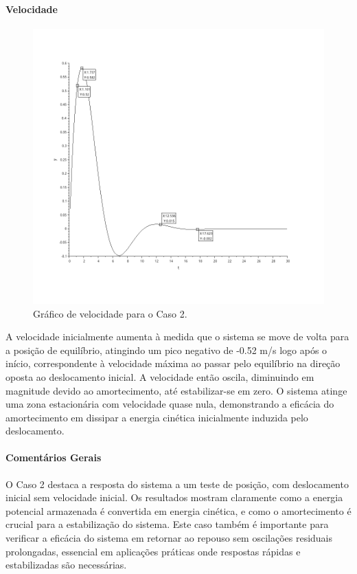 \paragraph{Velocidade}
\begin{figure}[H]
    \centering
    \includegraphics[height=0.7\textwidth]{atividades/2-atividade/assets/velocidade-caso-2.png}
    \caption{Gráfico de velocidade para o Caso 2.}
\end{figure}
A velocidade inicialmente aumenta à medida que o sistema se move de volta para a posição de equilíbrio, atingindo um pico negativo de -0.52 m/s logo após o início, correspondente à velocidade máxima ao passar pelo equilíbrio na direção oposta ao deslocamento inicial. A velocidade então oscila, diminuindo em magnitude devido ao amortecimento, até estabilizar-se em zero. O sistema atinge uma zona estacionária com velocidade quase nula, demonstrando a eficácia do amortecimento em dissipar a energia cinética inicialmente induzida pelo deslocamento.

\paragraph{Comentários Gerais}
O Caso 2 destaca a resposta do sistema a um teste de posição, com deslocamento inicial sem velocidade inicial. Os resultados mostram claramente como a energia potencial armazenada é convertida em energia cinética, e como o amortecimento é crucial para a estabilização do sistema. Este caso também é importante para verificar a eficácia do sistema em retornar ao repouso sem oscilações residuais prolongadas, essencial em aplicações práticas onde respostas rápidas e estabilizadas são necessárias.

